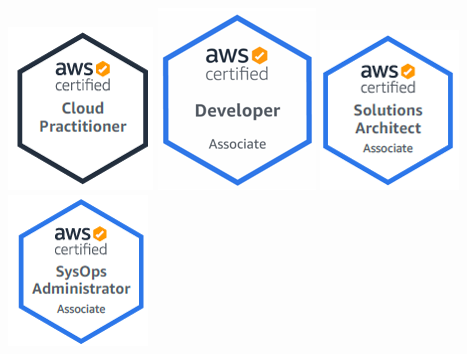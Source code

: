 \documentclass[10pt,a4paper,ragged2e]{altacv}
\begin{document}
\begin{paracol}{2}



\includegraphics[width=0.1 \textwidth]{clf} \includegraphics[width=0.1 \textwidth]{dva} \includegraphics[width=0.1 \textwidth]{saa} \includegraphics[width=0.1 \textwidth]{soa}\\


\end{paracol}
\end{document}
